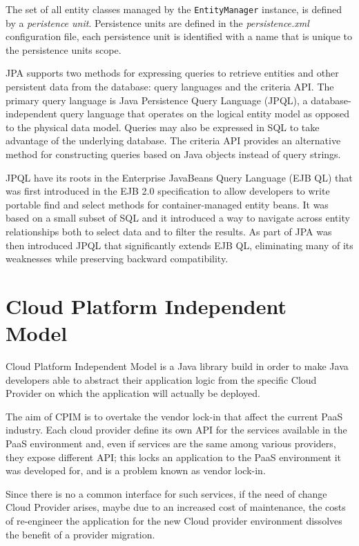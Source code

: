 \noindent The set of all entity classes managed by the \texttt{EntityManager} instance, is defined by a \textit{peristence unit}.
Persistence units are defined in the \textit{persistence.xml} configuration file, each persistence unit is identified with a name that is unique to the persistence units scope. 

\newparagraph JPA supports two methods for expressing queries to retrieve entities and other persistent data from the database: query languages and the criteria API. The primary query language is Java Persistence Query Language (JPQL), a database-independent query language that operates on the logical entity model as opposed to the physical data model. Queries may also be expressed in SQL to take advantage of the underlying database. The criteria API provides an alternative method for constructing queries based on Java objects instead of query strings.

\noindent JPQL have its roots in the Enterprise JavaBeans Query Language (EJB QL) that was first introduced in the EJB 2.0 specification to allow developers to write portable find and select methods for container-managed entity beans. It was based on a small subset of SQL and it introduced a way to navigate across entity relationships both to select data and to filter the results.
As part of JPA was then introduced JPQL that significantly extends EJB QL, eliminating many of its weaknesses while preserving backward compatibility.

\section{Cloud Platform Independent Model}
\label{sec:cpim}
Cloud Platform Independent Model \cite{thesis:cpim} is a Java library build in order to make Java developers able to abstract their application logic from the specific Cloud Provider on which the application will actually be deployed.

\noindent The aim of CPIM is to overtake the vendor lock-in that affect the current PaaS industry. Each cloud provider define its own API for the services available in the PaaS environment and, even if services are the same among various providers, they expose different API; this locks an application to the PaaS environment it was developed for, and is a problem known as vendor lock-in.

\noindent Since there is no a common interface for such services, if the need of change Cloud Provider arises, maybe due to an increased cost of maintenance, the costs of re-engineer the application for the new Cloud provider environment dissolves the benefit of a provider migration.

